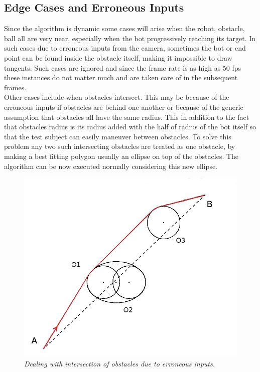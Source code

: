 \documentclass[letterpaper, 10 pt, conference]{ieeeconf}  %
\begin{document}
\subsection{Edge Cases and Erroneous Inputs}
Since the algorithm is dynamic some cases will arise when the robot, obstacle, ball all are very near, especially when the bot progressively reaching its target. In such cases due to erroneous inputs from the camera, sometimes the bot or end point can be found inside the obstacle itself, making it impossible to draw tangents. Such cases are ignored and since the frame rate is as high as 50 fps these instances do not matter much and are taken care of in the subsequent frames.
\\ 
Other cases include when obstacles intersect. This may be because of the erroneous inputs if obstacles are behind one another or because of the generic assumption that obstacles all have the same radius. This in addition to the fact that obstacles radius is its radius added with the half of radius of the bot itself so that the test subject can easily maneuver between obstacles. To solve this problem any two such intersecting obstacles are treated as one obstacle, by making a best fitting polygon usually an ellipse on top of the obstacles. The algorithm can be now executed normally considering this new ellipse.

\begin{figure}[h]  
\begin{center}  
\includegraphics[scale=0.3]{intersection1.JPG}  
\caption{\small \sl Dealing with intersection of obstacles due to erroneous inputs.\label{fig: intersection}}  
\end{center}  
\end{figure}
\end{document}
